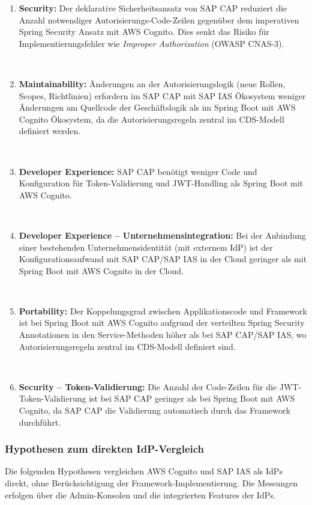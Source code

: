 \begin{enumerate}
    \item[$H_1$] \textbf{Security:} Der deklarative Sicherheitsansatz von \ac{SAP CAP} reduziert die Anzahl notwendiger Autorisierungs-Code-Zeilen gegenüber dem imperativen Spring Security Ansatz mit \ac{AWS} Cognito. Dies senkt das Risiko für Implementierungsfehler wie \textit{Improper Authorization} (\ac{OWASP} CNAS-3).

    \item[$H_2$] \textbf{Maintainability:} Änderungen an der Autorisierungslogik (neue Rollen, Scopes, Richtlinien) erfordern im \ac{SAP CAP} mit \ac{SAP IAS} Ökosystem weniger Änderungen am Quellcode der Geschäftslogik als im Spring Boot mit \ac{AWS} Cognito Ökosystem, da die Autorisierungsregeln zentral im \ac{CDS}-Modell definiert werden.

    \item[$H_{3a}$] \textbf{Developer Experience:} \ac{SAP CAP} benötigt weniger Code und Konfiguration für Token-Validierung und \ac{JWT}-Handling als Spring Boot mit \ac{AWS} Cognito.

    \item[$H_{3b}$] \textbf{Developer Experience -- Unternehmensintegration:} Bei der Anbindung einer bestehenden Unternehmensidentität (mit externem \ac{IdP}) ist der Konfigurationsaufwand mit \ac{SAP CAP}/\ac{SAP IAS} in der Cloud geringer als mit Spring Boot mit \ac{AWS} Cognito in der Cloud.

    \item[$H_4$] \textbf{Portability:} Der Koppelungsgrad zwischen Applikationscode und Framework ist bei Spring Boot mit \ac{AWS} Cognito aufgrund der verteilten Spring Security Annotationen in den Service-Methoden höher als bei \ac{SAP CAP}/\ac{SAP IAS}, wo Autorisierungsregeln zentral im \ac{CDS}-Modell definiert sind.

    \item[$H_5$] \textbf{Security -- Token-Validierung:} Die Anzahl der Code-Zeilen für die \ac{JWT}-Token-Validierung ist bei \ac{SAP CAP} geringer als bei Spring Boot mit \ac{AWS} Cognito, da \ac{SAP CAP} die Validierung automatisch durch das Framework durchführt.
\end{enumerate}

\subsubsection{Hypothesen zum direkten IdP-Vergleich}

Die folgenden Hypothesen vergleichen \ac{AWS} Cognito und \ac{SAP IAS} als \ac{IdP}s direkt, ohne Berücksichtigung der Framework-Implementierung. Die Messungen erfolgen über die Admin-Konsolen und die integrierten Features der \ac{IdP}s.


